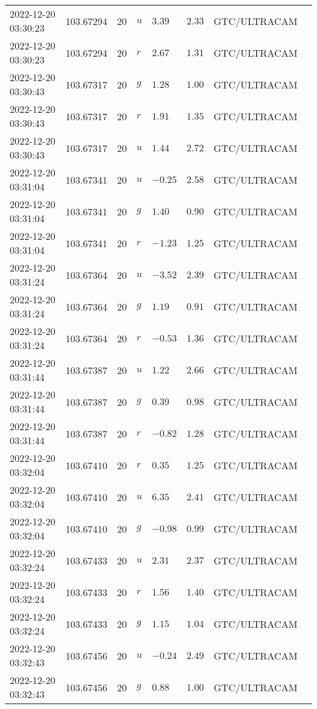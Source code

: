 \documentclass{nature_plusfigure}
\begin{document}
\begin{supplement}
\begin{center}
\begin{longtable}{llllllll}
2022-12-20 03:30:23 & 103.67294 & 20 & $u$ & $3.39$ & $2.33$ & GTC/ULTRACAM &  \\ 
2022-12-20 03:30:23 & 103.67294 & 20 & $r$ & $2.67$ & $1.31$ & GTC/ULTRACAM &  \\ 
2022-12-20 03:30:43 & 103.67317 & 20 & $g$ & $1.28$ & $1.00$ & GTC/ULTRACAM &  \\ 
2022-12-20 03:30:43 & 103.67317 & 20 & $r$ & $1.91$ & $1.35$ & GTC/ULTRACAM &  \\ 
2022-12-20 03:30:43 & 103.67317 & 20 & $u$ & $1.44$ & $2.72$ & GTC/ULTRACAM &  \\ 
2022-12-20 03:31:04 & 103.67341 & 20 & $u$ & $-0.25$ & $2.58$ & GTC/ULTRACAM &  \\ 
2022-12-20 03:31:04 & 103.67341 & 20 & $g$ & $1.40$ & $0.90$ & GTC/ULTRACAM &  \\ 
2022-12-20 03:31:04 & 103.67341 & 20 & $r$ & $-1.23$ & $1.25$ & GTC/ULTRACAM &  \\ 
2022-12-20 03:31:24 & 103.67364 & 20 & $u$ & $-3.52$ & $2.39$ & GTC/ULTRACAM &  \\ 
2022-12-20 03:31:24 & 103.67364 & 20 & $g$ & $1.19$ & $0.91$ & GTC/ULTRACAM &  \\ 
2022-12-20 03:31:24 & 103.67364 & 20 & $r$ & $-0.53$ & $1.36$ & GTC/ULTRACAM &  \\ 
2022-12-20 03:31:44 & 103.67387 & 20 & $u$ & $1.22$ & $2.66$ & GTC/ULTRACAM &  \\ 
2022-12-20 03:31:44 & 103.67387 & 20 & $g$ & $0.39$ & $0.98$ & GTC/ULTRACAM &  \\ 
2022-12-20 03:31:44 & 103.67387 & 20 & $r$ & $-0.82$ & $1.28$ & GTC/ULTRACAM &  \\ 
2022-12-20 03:32:04 & 103.67410 & 20 & $r$ & $0.35$ & $1.25$ & GTC/ULTRACAM &  \\ 
2022-12-20 03:32:04 & 103.67410 & 20 & $u$ & $6.35$ & $2.41$ & GTC/ULTRACAM &  \\ 
2022-12-20 03:32:04 & 103.67410 & 20 & $g$ & $-0.98$ & $0.99$ & GTC/ULTRACAM &  \\ 
2022-12-20 03:32:24 & 103.67433 & 20 & $u$ & $2.31$ & $2.37$ & GTC/ULTRACAM &  \\ 
2022-12-20 03:32:24 & 103.67433 & 20 & $r$ & $1.56$ & $1.40$ & GTC/ULTRACAM &  \\ 
2022-12-20 03:32:24 & 103.67433 & 20 & $g$ & $1.15$ & $1.04$ & GTC/ULTRACAM &  \\ 
2022-12-20 03:32:43 & 103.67456 & 20 & $u$ & $-0.24$ & $2.49$ & GTC/ULTRACAM &  \\ 
2022-12-20 03:32:43 & 103.67456 & 20 & $g$ & $0.88$ & $1.00$ & GTC/ULTRACAM &  \\ 

\end{longtable}
\end{center}
\end{supplement}
\end{document}
